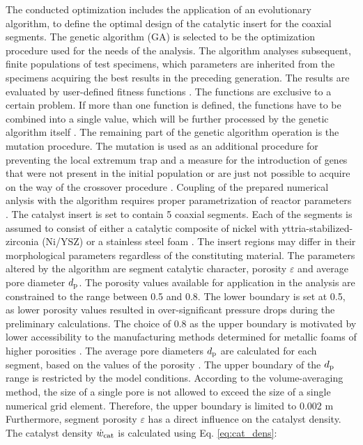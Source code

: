 \documentclass[preprint,12pt]{elsarticle}
\begin{document}
The conducted optimization includes the application of an evolutionary algorithm, to define the optimal design of the catalytic insert for the coaxial segments. The genetic algorithm (GA) is selected to be the optimization procedure used for the needs of the analysis. The algorithm analyses subsequent, finite populations of test specimens, which parameters are inherited from the specimens acquiring the best results in the preceding generation. The results are evaluated by user-defined fitness functions \cite{Tai2022}. The functions are exclusive to a certain problem. If more than one function is defined, the functions have to be combined into a single value, which will be further processed by the genetic algorithm itself \cite{Goldberg1989}. The remaining part of the genetic algorithm operation is the mutation procedure. The mutation is used as an additional procedure for preventing the local extremum trap and a measure for the introduction of genes that were not present in the initial population or are just not possible to acquire on the way of the crossover procedure \cite{Raja2017}. Coupling of the prepared numerical anlysis with the algorithm requires proper parametrization of reactor parameters \cite{Goldberg1989}. The catalyst insert is set to contain 5  coaxial segments. Each of the segments is assumed to consist of either a catalytic composite of nickel with yttria-stabilized-zirconia (Ni/YSZ) or a stainless steel foam \cite{Pajak2021IJHEa}. The insert regions may differ in their morphological parameters regardless of the constituting material. The parameters altered by the algorithm are segment catalytic character, porosity $\varepsilon$ and average pore diameter $d_{\rm{p}}$. The porosity values available for application in the analysis are constrained to the range between 0.5 and 0.8. The lower boundary is set at 0.5, as lower porosity values resulted in over-significant pressure drops during the preliminary calculations.  The choice of 0.8 as the upper boundary is motivated by lower accessibility to the manufacturing methods determined for metallic foams of higher porosities \cite{Banhart2001}.  The average pore diameters $d_{\rm{p}}$ are calculated for each segment, based on the values of the porosity \cite{Pajak2021IJHEa}. The upper boundary of the $d_{\rm{p}}$ range is restricted by the model conditions. According to the volume-averaging method, the size of a single pore is not allowed to exceed the size of a single numerical grid element. Therefore, the upper boundary is limited to 0.002 m \cite{Carbonell1984} Furthermore, segment porosity $\varepsilon$ has a direct influence on the catalyst density. The catalyst density $\dot{w}_{\rm{cat}}$ is calculated using Eq. \eqref{eq:cat_dens}:
\end{document}
